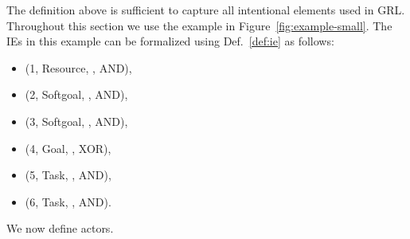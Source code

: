 The definition above is sufficient to capture all intentional elements used in GRL. %
Throughout this section we use the example in Figure~\ref{fig:example-small}. The IEs in this example can be formalized using Def.~\ref{def:ie} as follows:
\begin{itemize}
\item (1, Resource, , AND),
\item (2, Softgoal, , AND),
\item (3, Softgoal, , AND),
\item (4, Goal, , XOR),
\item (5, Task, , AND),
\item (6, Task, , AND).
\end{itemize}
We now define actors.

